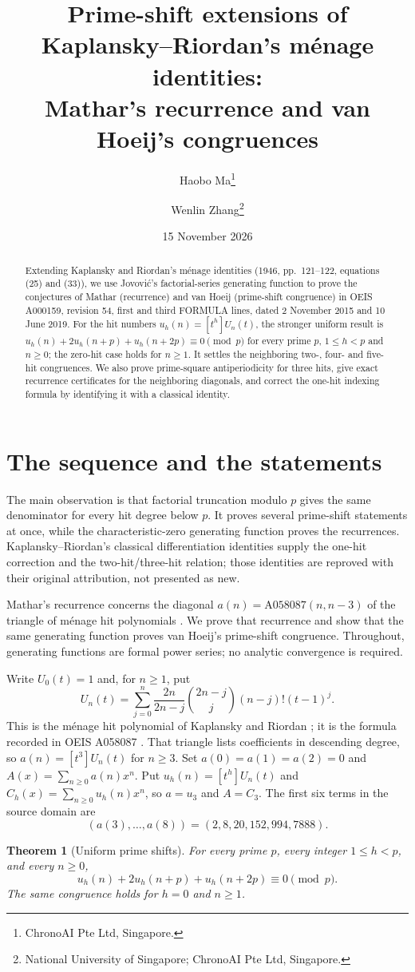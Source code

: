 \documentclass[11pt]{article}
\title{Prime-shift extensions of Kaplansky--Riordan's m\'enage identities:\protect\\
Mathar's recurrence and van Hoeij's congruences}
\author{Haobo Ma\thanks{ChronoAI Pte Ltd, Singapore.}\and
Wenlin Zhang\thanks{National University of Singapore; ChronoAI Pte Ltd, Singapore.}}
\date{15 November 2026}
\newtheorem{theorem}{Theorem}
\newcommand{\coeff}[2]{[#1^{#2}]}
\begin{document}
\maketitle
\begin{abstract}
Extending Kaplansky and Riordan's m\'enage identities (1946,
pp.~121--122, equations (25) and (33)), we use Jovovi\'c's factorial-series
generating function to prove the conjectures of Mathar (recurrence) and
van Hoeij (prime-shift congruence) in OEIS A000159, revision 54, first and third
FORMULA lines, dated 2 November 2015 and 10 June 2019.
For the hit numbers $u_h(n)=[t^h]U_n(t)$, the stronger uniform result is
$u_h(n)+2u_h(n+p)+u_h(n+2p)\equiv0\pmod p$ for every prime $p$,
$1\leq h<p$ and $n\geq0$; the zero-hit case holds for $n\geq1$.
It settles the neighboring two-, four- and five-hit congruences.
We also prove prime-square antiperiodicity for three hits, give exact
recurrence certificates for the neighboring diagonals, and correct the
one-hit indexing formula by identifying it with a classical identity.
\end{abstract}

\section{The sequence and the statements}
The main observation is that factorial truncation modulo $p$ gives the
same denominator for every hit degree below $p$. It proves several
prime-shift statements at once, while the characteristic-zero generating
function proves the recurrences. Kaplansky--Riordan's classical
differentiation identities supply the one-hit correction and the
two-hit/three-hit relation; those identities are reproved with their
original attribution, not presented as new.

Mathar's recurrence concerns the diagonal
$a(n)=\mathrm{A058087}(n,n-3)$ of the triangle of m\'enage hit
polynomials \cite{a159,a58087}. We prove that recurrence and show
that the same generating function proves van Hoeij's prime-shift
congruence. Throughout, generating functions are formal power series;
no analytic convergence is required.

Write $U_0(t)=1$ and, for $n\geq1$, put
\begin{equation}\label{eq:rook}
 U_n(t)=\sum_{j=0}^{n}\frac{2n}{2n-j}
           \binom{2n-j}{j}(n-j)!(t-1)^j.
\end{equation}
This is the m\'enage hit polynomial of Kaplansky and Riordan
\cite[p.~121, equation (25)]{kr}; it is the formula recorded in
OEIS A058087 \cite[FORMULA, Orrick, 9 August 2020]{a58087}.
That triangle lists coefficients in descending degree, so
$a(n)=\coeff{t}{3}U_n(t)$ for $n\geq3$.
Set $a(0)=a(1)=a(2)=0$ and
$A(x)=\sum_{n\geq0}a(n)x^n$.
Put $u_h(n)=[t^h]U_n(t)$ and $C_h(x)=\sum_{n\geq0}u_h(n)x^n$,
so $a=u_3$ and $A=C_3$. The first six terms in the source domain are
\[
 (a(3),\ldots,a(8))=(2,8,20,152,994,7888).
\]
\begin{theorem}[Uniform prime shifts]\label{thm:uniform}
For every prime $p$, every integer $1\leq h<p$, and every $n\geq0$,
\[
 u_h(n)+2u_h(n+p)+u_h(n+2p)\equiv0\pmod p.
\]
The same congruence holds for $h=0$ and $n\geq1$.
\end{theorem}
\end{document}
